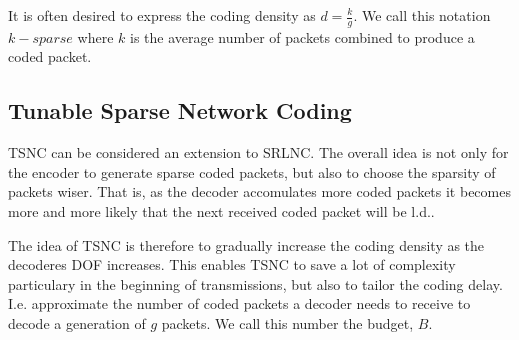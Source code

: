 It is often desired to express the coding density as $d=\frac{k}{g}$. We call
this notation $k-sparse$ where $k$ is the average number of packets combined to
produce a coded packet.







%

\subsection{Tunable Sparse Network Coding}

\ac{TSNC} can be considered an extension to \ac{SRLNC}. The overall idea is
not only for the encoder to generate sparse coded packets, but also to
choose the sparsity of packets wiser. That is, as the decoder accomulates more
coded packets it becomes more and more likely that the next received
coded packet will be \ac{l.d.}.

The idea of \ac{TSNC} is therefore to gradually increase the coding density
as the decoderes \ac{DOF} increases. This enables TSNC to save a lot of
complexity particulary in the beginning of transmissions, but also to
tailor the coding delay. I.e. approximate the number of coded packets a
decoder needs to receive to decode a generation of $g$ packets. We call
this number the budget, $B$.

